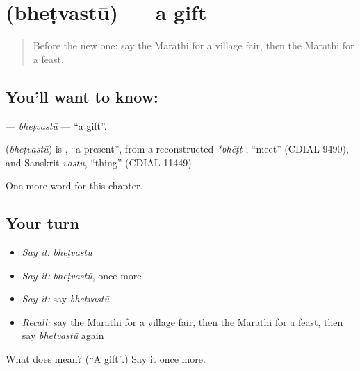 \section[\texorpdfstring{\mr{भेटवस्तू} (bheṭvastū)}{भेटवस्तू (bheṭvastū)}]{ (bheṭvastū) — a gift}

\label{lesson:MR-C248-bhetvastu}



\begin{quote}
Before the new one: say the Marathi for a village fair, then the Marathi for a feast.
\end{quote}

\subsection*{You'll want to know: }
\textbf{} — \emph{bheṭvastū} — \textquotedblleft{}a gift\textquotedblright{}.

\begin{cousinweb}
\textbf{} (\emph{bheṭvastū}) is \textbf{}, \textquotedblleft{}a present\textquotedblright{}, from a reconstructed \emph{*bhēṭṭ-}, \textquotedblleft{}meet\textquotedblright{} (CDIAL 9490), and Sanskrit \emph{vastu}, \textquotedblleft{}thing\textquotedblright{} (CDIAL 11449).
\end{cousinweb}

\begin{grammarlens}[title={What you've built}]
One more word for this chapter.
\end{grammarlens}

\subsection*{Your turn}
\begin{itemize}
\raggedright
  \item \emph{Say it:} \emph{bheṭvastū}
  \item \emph{Say it:} \emph{bheṭvastū}, once more
  \item \emph{Say it:} say \emph{bheṭvastū}
  \item \emph{Recall:} say the Marathi for a village fair, then the Marathi for a feast, then say \emph{bheṭvastū} again
\end{itemize}

\begin{tcolorbox}[breakable,colback=teal!4,colframe=teal!35!black,title={Before you move on}]
What does  mean? (\textquotedblleft{}A gift\textquotedblright{}.) Say it once more.
\end{tcolorbox}
